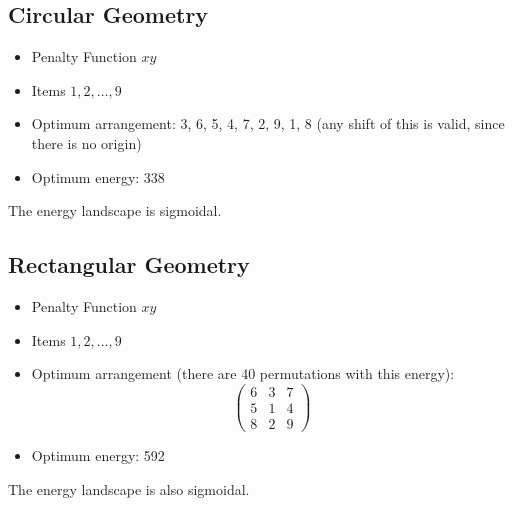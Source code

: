 \documentclass{article}
\begin{document}
\subsection{Circular Geometry}
\begin{itemize}
    \item Penalty Function $xy$
    \item Items $1, 2, \ldots, 9$
    \item Optimum arrangement: 3, 6, 5, 4, 7, 2, 9, 1, 8 (any shift of this is valid, since there is no origin)
    \item Optimum energy: 338
\end{itemize}

The energy landscape is sigmoidal.

\subsection{Rectangular Geometry}

\begin{itemize}
    \item Penalty Function $xy$
    \item Items $1, 2, \ldots, 9$
    \item Optimum arrangement (there are 40 permutations with this energy): 
        \begin{equation}
        \begin{pmatrix}
            6 & 3 & 7 \\
            5 & 1 & 4 \\
            8 & 2 & 9
        \end{pmatrix}
        \end{equation}
    \item Optimum energy: 592
\end{itemize}

The energy landscape is also sigmoidal.
\end{document}

